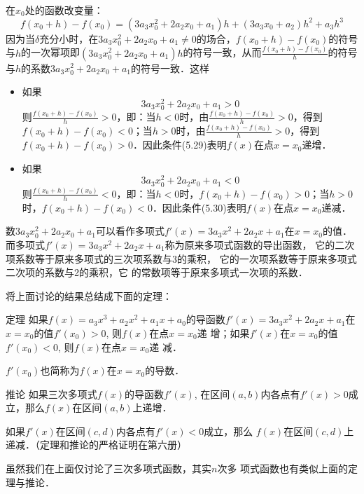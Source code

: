 在$x_0$处的函数改变量：
\[f(x_0+h)-f(x_0)=(3a_3x_0^2+2a_2x_0+a_1)h+(3a_3x_0+
a_2)h^2+a_3h^3\]
因为当$\delta$充分小时，在$3a_3x_0^2+2a_2x_0+a_1\ne 0$的场合，$f(x_0+h)-f(x_0)$的符号与$h$的一次幂项即$(3a_3x_0^2+2a_2x_0+a_1)h$的符号一致，从而$\frac{f(x_0+h)-f(x_0)}{h}$的符号与$h$的系数$3a_3x_0^2+2a_2x_0+a_1$的符号一致．这样
\begin{itemize}
    \item 如果
    \begin{equation}
        3a_3x_0^2+2a_2x_0+a_1>0
    \end{equation}
    则$\frac{f(x_0+h)-f(x_0)}{h}>0$，即：当$h<0$时，由$\frac{f(x_0+h)-f(x_0)}{h}>0$，得到$f(x_0+h)-f(x_0)<0$；当$h>0$时，由$\frac{f(x_0+h)-f(x_0)}{h}>0$，得到$f(x_0+h)-f(x_0)>0$．因此条件(5.29)表明$f(x)$在点$x=x_0$递增．
    \item 如果
    \begin{equation}
        3a_3x_0^2+2a_2x_0+a_1<0
    \end{equation}
    则$\frac{f(x_0+h)-f(x_0)}{h}<0$，即：当$h<0$时，$f(x_0+h)-f(x_0)>0$；当$h>0$时，$f(x_0+h)-f(x_0)<0$．因此条件(5.30)表明$f(x)$在点$x=x_0$递减．
\end{itemize}

数$3a_3x_0^2+2a_2x_0+a_1$可以看作多项式$f'(x)=3a_3x^2+2a_2x+a_1$在$x=x_0$的值．而多项式$f'(x)=3a_3x^2+2a_2x+a_1$称为原来多项式函数的导出函数，
    它的二次项系数等于原来多项式的三次项系数与3的乘积，
    它的一次项系数等于原来多项式二次项的系数与2的乘积，它
    的常数项等于原来多项式一次项的系数．

    将上面讨论的结果总结成下面的定理：

\begin{blk}{定理}
    如果$f(x)=a_3x^3+a_2x^2+a_1x+a_0$的导函数$f'(x)=3a_3x^2+2a_2x+a_1$在$x=x_0$的值$f'(x_0)>0$, 则$f(x)$在点$x=x_0$递
增；如果$f'(x)$在$x=x_0$的值$f'(x_0)<0$, 则$f(x)$在点$x=x_0$递
减．
\end{blk}

$f'(x_0)$也简称为$f(x)$在$x=x_0$的导数．

\begin{blk}{推论}
    如果三次多项式$f(x)$的导函数$f'(x)$, 在区间$(a,
b)$内各点有$f'(x)>0$成立，那么$f(x)$在区间$(a,b)$上递增．

如果$f'(x)$在区间$(c,d)$内各点有$f'(x)<0$成立，那么
$f(x)$在区间$(c,d)$上递减．（定理和推论的严格证明在第六册）
\end{blk}
 
虽然我们在上面仅讨论了三次多项式函数，其实$n$次多
项式函数也有类似上面的定理与推论．






